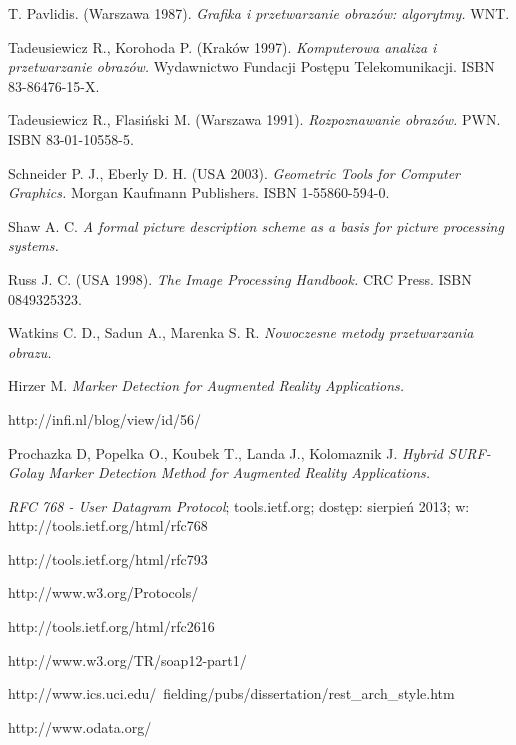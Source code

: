 \begin{thebibliography}{}

  T. Pavlidis.
  (Warszawa 1987).
  \emph{Grafika i przetwarzanie obrazów: algorytmy.}
  WNT.

  Tadeusiewicz R., Korohoda P.
  (Kraków 1997).
  \emph{Komputerowa analiza i przetwarzanie obrazów.}
  Wydawnictwo Fundacji Postępu Telekomunikacji.
  ISBN 83-86476-15-X.

  Tadeusiewicz R., Flasiński M.
  (Warszawa 1991).
  \emph{Rozpoznawanie obrazów.}
  PWN.
  ISBN 83-01-10558-5.
  
  Schneider P. J., Eberly D. H.
  (USA 2003).
  \emph{Geometric Tools for Computer Graphics.}
  Morgan Kaufmann Publishers.
  ISBN 1-55860-594-0.
 
  Shaw A. C.
  \emph{A formal picture description scheme as a basis for picture processing systems.}
 
  Russ J. C.
  (USA 1998).
  \emph{The Image Processing Handbook.}
  CRC Press.
  ISBN 0849325323.
 
  Watkins C. D., Sadun A., Marenka S. R.
  \emph{Nowoczesne metody przetwarzania obrazu.}
 
  Hirzer M.
  \emph{Marker Detection for Augmented Reality Applications.}
 
  http://infi.nl/blog/view/id/56/
 
  Prochazka D, Popelka O., Koubek T., Landa J., Kolomaznik J.
  \emph{Hybrid SURF-Golay Marker Detection Method for Augmented Reality Applications.}
 
  \emph{RFC 768 - User Datagram Protocol};
  tools.ietf.org;
  dostęp: sierpień 2013;
  w: http://tools.ietf.org/html/rfc768
 
  http://tools.ietf.org/html/rfc793
 
  http://www.w3.org/Protocols/
 
  http://tools.ietf.org/html/rfc2616
 
  http://www.w3.org/TR/soap12-part1/
 
  http://www.ics.uci.edu/~fielding/pubs/dissertation/rest\_arch\_style.htm
 
  http://www.odata.org/
                
\end{thebibliography}
